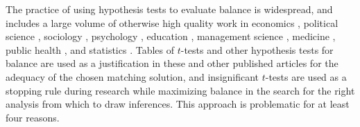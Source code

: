 \documentclass[11pt,titlepage]{article}
\begin{document}
The practice of using hypothesis tests to evaluate balance is
widespread, and includes a large volume of otherwise high quality work
in economics \citep{MilFreMcH03,BlaSmi04,AgoDyn04,DehWah99,
  DehWah02,SmiTod05}, political science \citep{Imai05,SimHop05},
sociology \citep{LunSmi05}, psychology
\citep{HavNag05,HilWalBro05,YosMagBos03,JonDAgGon04,McCRidMor04},
education \citep{Crosnoe05,SchBuc03}, management science
\citep{FreMil04, Villalonga04,WanSchAvo05}, medicine
\citep{WanSchAvo05, MacRivJur06,LinPekWan06,ManTudDie06, PetRoeMul06,
  ShiLitPot06,SabCanGib05,PerUndZho00,AusMam06,AusMamStu05}, public
health \citep{NovReaRau06,ElBGilWu05,LauSmiSta00,BinBreEar05}, and
statistics \citep{LuZanHor01}.  Tables of $t$-tests and other
hypothesis tests for balance are used as a justification in these and
other published articles for the adequacy of the chosen matching
solution, and insignificant $t$-tests are used as a stopping rule
during research while maximizing balance in the search for the right
analysis from which to draw inferences.  This approach is problematic
for at least four reasons.
\end{document}
